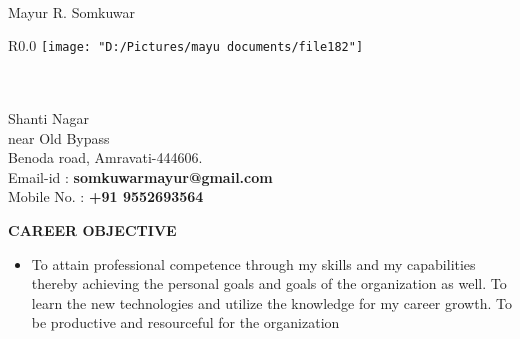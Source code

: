 \documentclass[a4paper,20pt]{article}
\begin{document}
	
\hspace{0.5cm}\\[-0.2cm]


 {\huge  {\begin{center}
		Mayur R. Somkuwar
		\end{center}}}

\begin{wrapfigure}{R}{0.0\linewidth}
	\hspace*{15em}
	\texttt{[image: "D:/Pictures/mayu documents/file182"]}

\end{wrapfigure}
\indent \\
\indent \\
\indent Shanti Nagar \\ 
\indent near Old Bypass\\
\indent Benoda road, Amravati-444606. \\
\indent Email-id : \textbf{somkuwarmayur@gmail.com} \\
\indent Mobile No. : \textbf{+91 9552693564} \\
	 \newline 



\textbf{\large {CAREER OBJECTIVE}}
\begin{itemize}
	\item[] \noindent To attain professional competence through my skills and my capabilities thereby achieving the personal goals and goals of the organization as well. To learn the new technologies and utilize the knowledge for my career growth. To be productive and resourceful for the organization
\newline
\end{itemize}
\end{document}
